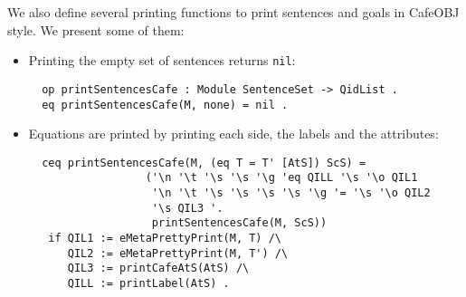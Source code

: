 We also define several printing functions to print sentences and goals in
CafeOBJ style. We present some of them:
\begin{itemize}
\item
Printing the empty set of sentences returns \verb"nil":

{\codesize
\begin{verbatim}
  op printSentencesCafe : Module SentenceSet -> QidList .
  eq printSentencesCafe(M, none) = nil .
\end{verbatim}
}

\item
Equations are printed by printing each side, the labels and the attributes:

{\codesize
\begin{verbatim}
  ceq printSentencesCafe(M, (eq T = T' [AtS]) ScS) =
                  ('\n '\t '\s '\s '\g 'eq QILL '\s '\o QIL1
                   '\n '\t '\s '\s '\s '\s '\g '= '\s '\o QIL2
                   '\s QIL3 '.
                   printSentencesCafe(M, ScS))
   if QIL1 := eMetaPrettyPrint(M, T) /\
      QIL2 := eMetaPrettyPrint(M, T') /\
      QIL3 := printCafeAtS(AtS) /\
      QILL := printLabel(AtS) .
\end{verbatim}
}
{\codesize
\begin{comment}
  ceq printSentencesCafe(M, (ceq T = T' if C [AtS]) ScS) =
                  ('\n '\t '\s '\s '\g 'ceq QILL '\s '\o QIL1
                   '\n '\t '\s '\s '\s '\s '\g '= '\s '\o QIL2
                   '\n '\t '\s '\s '\s '\s '\g 'if '\o '\s QIL3
                   '\s QIL4 '.
                   printSentencesCafe(M, ScS))
   if QIL1 := eMetaPrettyPrint(M, T) /\
      QIL2 := eMetaPrettyPrint(M, T') /\
      QIL3 := eMetaPrettyPrint(M, C) /\
      QIL4 := printCafeAtS(AtS) /\
      QILL := printLabel(AtS) .

  ceq printSentencesCafe(M, (rl T => T' [AtS]) ScS) =
                  ('\n '\t '\s '\s '\g 'trans QILL '\s '\o QIL1
                   '\n '\t '\s '\s '\s '\s '\g '=> '\s '\o QIL2
                   '\s QIL3 '.
                   printSentencesCafe(M, ScS))
   if QIL1 := eMetaPrettyPrint(M, T) /\
      QIL2 := eMetaPrettyPrint(M, T') /\
      QIL3 := printCafeAtS(AtS) /\
      QILL := printLabel(AtS) .

  ceq printSentencesCafe(M, (crl T => T' if C [AtS]) ScS) =
                  ('\n '\t '\s '\s '\g 'ctrans QILL '\s '\o QIL1
                   '\n '\t '\s '\s '\s '\s '\g '=> '\s '\o QIL2
                   '\n '\t '\s '\s '\s '\s '\g 'if '\o '\s QIL3
                   '\s QIL4 '.
                   printSentencesCafe(M, ScS))
   if QIL1 := eMetaPrettyPrint(M, T) /\
      QIL2 := eMetaPrettyPrint(M, T') /\
      QIL3 := eMetaPrettyPrint(M, C) /\
      QIL4 := printCafeAtS(AtS) /\
      QILL := printLabel(AtS) .
\end{comment}
}


\end{itemize}
